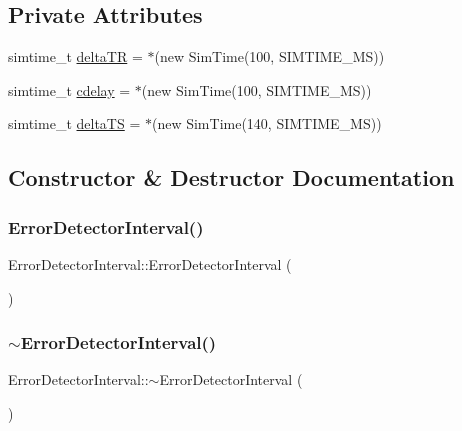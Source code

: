 \subsection*{Private Attributes}
\begin{DoxyCompactItemize}
\item 
simtime\+\_\+t \hyperlink{class_error_detector_interval_a24f229a469ae7c4314a948015cddb277}{delta\+TR} = $\ast$(new Sim\+Time(100, S\+I\+M\+T\+I\+M\+E\+\_\+\+MS))
\item 
simtime\+\_\+t \hyperlink{class_error_detector_interval_adb614477095a1b9753f088f28776c677}{cdelay} = $\ast$(new Sim\+Time(100, S\+I\+M\+T\+I\+M\+E\+\_\+\+MS))
\item 
simtime\+\_\+t \hyperlink{class_error_detector_interval_a2368ba76496cfd25487e150a961bb08b}{delta\+TS} = $\ast$(new Sim\+Time(140, S\+I\+M\+T\+I\+M\+E\+\_\+\+MS))
\end{DoxyCompactItemize}


\subsection{Constructor \& Destructor Documentation}
\mbox{\label{class_error_detector_interval_a31b5edf31d0bfa45dfe4d0e4733d59b2}} 
\subsubsection{\texorpdfstring{Error\+Detector\+Interval()}{ErrorDetectorInterval()}}
{\footnotesize\ttfamily Error\+Detector\+Interval\+::\+Error\+Detector\+Interval (\begin{DoxyParamCaption}{ }\end{DoxyParamCaption})}

\mbox{\label{class_error_detector_interval_a13501d384b2f53dd19dfa1dd9ee0f8fe}} 
\subsubsection{\texorpdfstring{$\sim$\+Error\+Detector\+Interval()}{~ErrorDetectorInterval()}}
{\footnotesize\ttfamily Error\+Detector\+Interval\+::$\sim$\+Error\+Detector\+Interval (\begin{DoxyParamCaption}{ }\end{DoxyParamCaption})\hspace{0.3cm}{\ttfamily [virtual]}}



